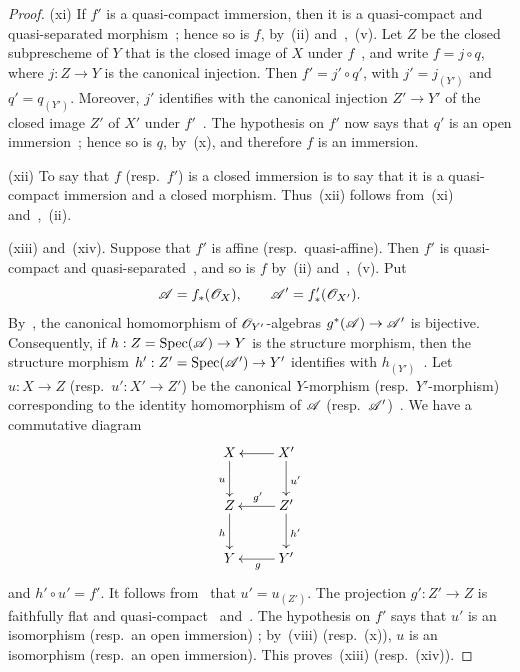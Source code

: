 \begin{proof}

\textnormal{(xi)} If $f'$ is a quasi-compact immersion, then it is a
quasi-compact and quasi-separated morphism~; hence so
is $f$, by~\textnormal{(ii)} and~,~(v). Let $Z$ be the
closed subprescheme of $Y$ that is the closed image of $X$ under
$f$~, and write $f=j\circ q$, where $j:Z\to Y$ is the
canonical injection. Then $f'=j'\circ q'$, with
$j'=j_{(Y')}$ and $q'=q_{(Y')}$. Moreover, $j'$ identifies with the
canonical injection $Z'\to Y'$ of the closed image $Z'$ of $X'$ under
$f'$~. The hypothesis on $f'$ now says that $q'$ is an
open immersion~; hence so is $q$,
by~\textnormal{(x)}, and therefore $f$ is an immersion.

\textnormal{(xii)} To say that $f$ \textnormal{(}resp.\ $f'$\textnormal{)}
is a closed immersion is to say that it is a quasi-compact immersion
and a closed morphism. Thus~\textnormal{(xii)} follows
from~\textnormal{(xi)} and~,~(ii).

\textnormal{(xiii)} and~\textnormal{(xiv)}. Suppose that $f'$ is affine
\textnormal{(}resp.\ quasi-affine\textnormal{)}. Then $f'$ is
quasi-compact and quasi-separated~, and so is $f$
by~\textnormal{(ii)} and~,~(v). Put
\[
  \mathscr{A}=f_*(\mathscr{O}_X),\qquad
  \mathscr{A}'=f'_*(\mathscr{O}_{X'}).
\]
By~, the canonical homomorphism of
$\mathscr{O}_{Y'}$-algebras $g^*(\mathscr{A})\to\mathscr{A}'$ is bijective.
Consequently, if $h:Z=\operatorname{Spec}(\mathscr{A})\to Y$ is the structure morphism,
then the structure morphism $h':Z'=\operatorname{Spec}(\mathscr{A}')\to Y'$ identifies
with $h_{(Y')}$~. Let $u:X\to Z$
\textnormal{(}resp.\ $u':X'\to Z'$\textnormal{)} be the canonical
$Y$-morphism \textnormal{(}resp.\ $Y'$-morphism\textnormal{)}
corresponding to the identity homomorphism of $\mathscr{A}$
\textnormal{(}resp.\ $\mathscr{A}'$\textnormal{)}~.
We have a commutative diagram
\[
\xymatrix{
  X \ar[d]_u & X' \ar[l] \ar[d]^{u'} \\
  Z \ar[d]_h & Z' \ar[l]_{g'} \ar[d]^{h'} \\
  Y & Y' \ar[l]^g
}
\]
and $h'\circ u'=f'$. It follows from~ that
$u'=u_{(Z')}$. The projection $g':Z'\to Z$ is faithfully flat and
quasi-compact~ and~. The hypothesis on
$f'$ says that $u'$ is an isomorphism
\textnormal{(}resp.\ an open immersion\textnormal{)}
; by~\textnormal{(viii)}
\textnormal{(}resp.\ (x)\textnormal{)}, $u$ is an
isomorphism \textnormal{(}resp.\ an open immersion\textnormal{)}. This
proves~\textnormal{(xiii)} \textnormal{(}resp.\
\textnormal{(xiv)}\textnormal{)}.


\end{proof}
